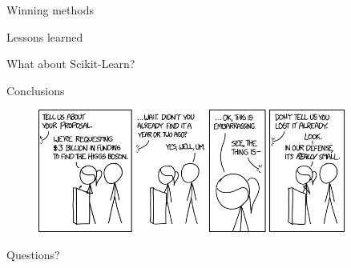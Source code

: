 \documentclass{beamer}
\begin{document}
\begin{frame}{Winning methods}

\end{frame}

\begin{frame}{Lessons learned}

\end{frame}

\begin{frame}{What about Scikit-Learn?}
\end{frame}


\begin{frame}{Conclusions}
\end{frame}


\appendix

\begin{frame}

\begin{figure}
\includegraphics[width=0.9\textwidth]{./figures/xkcd.png}
\end{figure}

\vspace{0.5cm}

\begin{center}
{\Huge  Questions?}
\end{center}
\end{frame}
\end{document}
